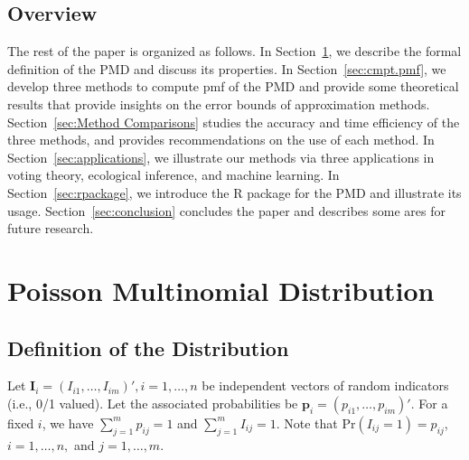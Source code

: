 \documentclass[12pt]{article}
\newcommand{\Ivec}{{\boldsymbol{I}}}
\newcommand{\pvec}{\boldsymbol{p}}
\newcommand{\pr}{{\textrm{Pr}}}
\newcommand{\PMD}{\textrm{PMD}}
\begin{document}






\subsection{Overview}
The rest of the paper is organized as follows. In Section~\ref{sec:pmd}, we describe the formal definition of the PMD and discuss its properties. In Section~\ref{sec:cmpt.pmf}, we develop three methods to compute pmf of the $\PMD$ and provide some theoretical results that provide insights on the error bounds of approximation methods. Section~\ref{sec:Method Comparisons} studies the accuracy and time efficiency of the three methods, and provides recommendations on the use of each method. In Section~\ref{sec:applications}, we illustrate our methods via three applications in voting theory, ecological inference, and machine learning. In Section~\ref{sec:rpackage}, we introduce the R package for the PMD and illustrate its usage. Section~\ref{sec:conclusion} concludes the paper and describes some ares for future research.



\section{Poisson Multinomial Distribution} \label{sec:pmd}
\subsection{Definition of the Distribution} \label{subsec:def}
Let $\Ivec_{i} = (I_{i1}, \dots, I_{im})', i=1, \dots, n$ be independent vectors of random indicators (i.e., 0/1 valued). Let the associated probabilities be $\pvec_{i} = (p_{i1}, \dots, p_{im})'$. For a fixed $i$, we have $\sum_{j=1}^{m}p_{ij}=1$ and $\sum_{j=1}^{m}I_{ij}=1$. Note that $\pr(I_{ij}=1)=p_{ij}$, $i=1,\ldots, n,$ and  $j=1, \ldots, m$. 
\end{document}
